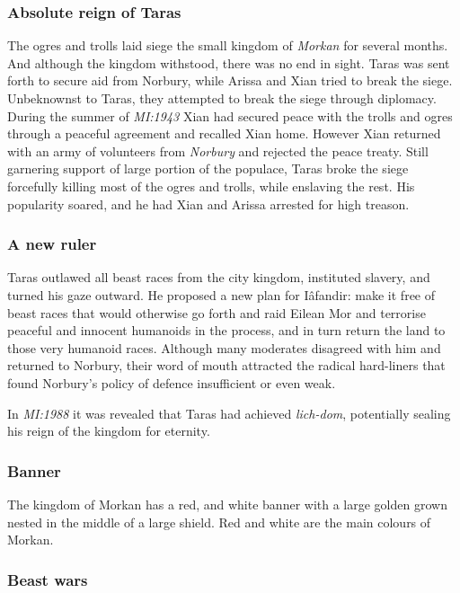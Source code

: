 \subsubsection*{Absolute reign of Taras}

The ogres and trolls laid siege the small kingdom of \emph{Morkan} for several
months. And although the kingdom withstood, there was no end in sight. Taras
was sent forth to secure aid from Norbury, while Arissa and Xian tried to
break the siege. Unbeknownst to Taras, they attempted to break the siege
through diplomacy. During the summer of \emph{MI:1943} Xian had secured peace
with the trolls and ogres through a peaceful agreement and recalled Xian home.
However Xian returned with an army of volunteers from \emph{Norbury} and
rejected the peace treaty. Still garnering support of large portion of the
populace, Taras broke the siege forcefully killing most of the ogres and
trolls, while enslaving the rest. His popularity soared, and he had Xian and
Arissa arrested for high treason.

\subsubsection*{A new ruler}

Taras outlawed all beast races from the city kingdom, instituted slavery,
and turned his gaze outward. He proposed a new plan for Iâfandir: make it free
of beast races that would otherwise go forth and raid Eilean Mor and terrorise
peaceful and innocent humanoids in the process, and in turn return the land to
those very humanoid races. Although many moderates disagreed with him and
returned to Norbury, their word of mouth attracted the radical hard-liners
that found Norbury's policy of defence insufficient or even weak.

In \emph{MI:1988} it was revealed that Taras had achieved \emph{lich-dom},
potentially sealing his reign of the kingdom for eternity.

\subsubsection*{Banner}

The kingdom of Morkan has a red, and white banner with a large golden grown
nested in the middle of a large shield. Red and white are the main colours
of Morkan.

\subsubsection*{Beast wars}

